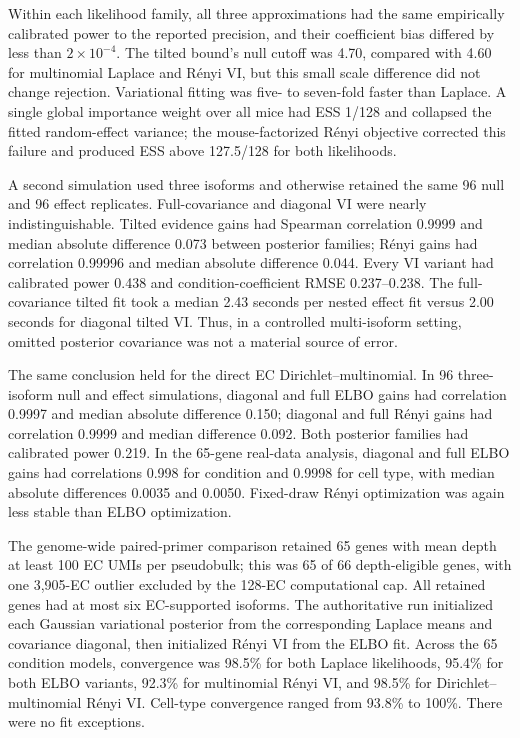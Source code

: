 \documentclass[11pt]{article}
\begin{document}
Within each likelihood family, all three approximations had the same empirically calibrated power to the reported precision, and their coefficient bias differed by less than \(2\times10^{-4}\). The tilted bound's null cutoff was 4.70, compared with 4.60 for multinomial Laplace and R\'enyi VI, but this small scale difference did not change rejection. Variational fitting was five- to seven-fold faster than Laplace. A single global importance weight over all mice had ESS 1/128 and collapsed the fitted random-effect variance; the mouse-factorized R\'enyi objective corrected this failure and produced ESS above 127.5/128 for both likelihoods.

A second simulation used three isoforms and otherwise retained the same 96 null and 96 effect replicates. Full-covariance and diagonal VI were nearly indistinguishable. Tilted evidence gains had Spearman correlation 0.9999 and median absolute difference 0.073 between posterior families; R\'enyi gains had correlation 0.99996 and median absolute difference 0.044. Every VI variant had calibrated power 0.438 and condition-coefficient RMSE 0.237--0.238. The full-covariance tilted fit took a median 2.43 seconds per nested effect fit versus 2.00 seconds for diagonal tilted VI. Thus, in a controlled multi-isoform setting, omitted posterior covariance was not a material source of error.

The same conclusion held for the direct EC Dirichlet--multinomial. In 96 three-isoform null and effect simulations, diagonal and full ELBO gains had correlation 0.9997 and median absolute difference 0.150; diagonal and full R\'enyi gains had correlation 0.9999 and median difference 0.092. Both posterior families had calibrated power 0.219. In the 65-gene real-data analysis, diagonal and full ELBO gains had correlations 0.998 for condition and 0.9998 for cell type, with median absolute differences 0.0035 and 0.0050. Fixed-draw R\'enyi optimization was again less stable than ELBO optimization.

The genome-wide paired-primer comparison retained 65 genes with mean depth at least 100 EC UMIs per pseudobulk; this was 65 of 66 depth-eligible genes, with one 3,905-EC outlier excluded by the 128-EC computational cap. All retained genes had at most six EC-supported isoforms. The authoritative run initialized each Gaussian variational posterior from the corresponding Laplace means and covariance diagonal, then initialized R\'enyi VI from the ELBO fit. Across the 65 condition models, convergence was 98.5\% for both Laplace likelihoods, 95.4\% for both ELBO variants, 92.3\% for multinomial R\'enyi VI, and 98.5\% for Dirichlet--multinomial R\'enyi VI. Cell-type convergence ranged from 93.8\% to 100\%. There were no fit exceptions.
\end{document}

